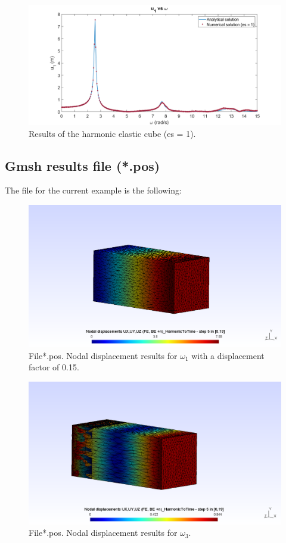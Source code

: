 \documentclass[a4]{article}
\begin{document}
\begin{figure}[h!]
	\centering
	\includegraphics[scale = 0.45]{es1.png}
	\caption{Results of the harmonic elastic cube (es = 1).}
	\label{fig:cube_results2}
\end{figure}

\subsection{Gmsh results file (*.pos)}

The file for the current example is the following:

\begin{figure}[h]
	\centering
	\includegraphics[scale = 0.5]{u_w1.png}
	\caption{File*.pos. Nodal displacement results for $\omega_1$ with a displacement factor of 0.15.}
	\label{fig:u_w1}
\end{figure}

\begin{figure}[h!]
	\centering
	\includegraphics[scale = 0.5]{u_w3.png}
	\caption{File*.pos. Nodal displacement results for $\omega_3$.}
	\label{fig:u_w3}
\end{figure}
\end{document}
